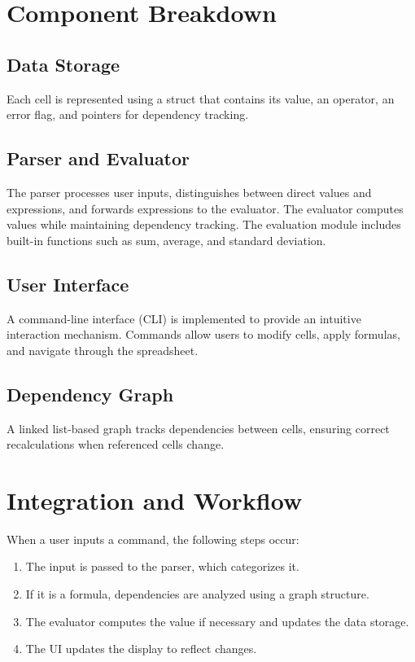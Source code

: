 \documentclass{article}
\begin{document}
\section{Component Breakdown}
\subsection{Data Storage}
Each cell is represented using a struct that contains its value, an operator, an error flag, and pointers for dependency tracking.

\subsection{Parser and Evaluator}
The parser processes user inputs, distinguishes between direct values and expressions, and forwards expressions to the evaluator. The evaluator computes values while maintaining dependency tracking. The evaluation module includes built-in functions such as sum, average, and standard deviation.

\subsection{User Interface}
A command-line interface (CLI) is implemented to provide an intuitive interaction mechanism. Commands allow users to modify cells, apply formulas, and navigate through the spreadsheet.

\subsection{Dependency Graph}
A linked list-based graph tracks dependencies between cells, ensuring correct recalculations when referenced cells change.

\section{Integration and Workflow}
When a user inputs a command, the following steps occur:
\begin{enumerate}
    \item The input is passed to the parser, which categorizes it.
    \item If it is a formula, dependencies are analyzed using a graph structure.
    \item The evaluator computes the value if necessary and updates the data storage.
    \item The UI updates the display to reflect changes.
\end{enumerate}
\end{document}
